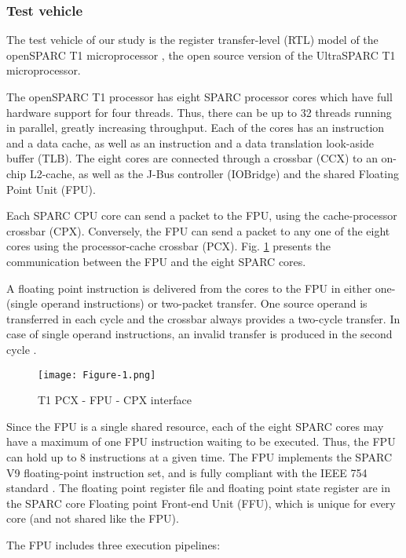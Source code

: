 \documentclass[12pt]{yalephd}
\begin{document}
\subsubsection{Test vehicle}

The test vehicle of our study is the register transfer-level (RTL) model of the openSPARC T1 microprocessor \cite{T1site}, the open source version of the UltraSPARC T1 microprocessor.

The openSPARC T1 processor has eight SPARC processor cores which have full hardware support for four threads. Thus, there can be up to 32 threads running in parallel, greatly increasing throughput. Each of the cores has an instruction and a data cache, as well as an instruction and a data translation look-aside buffer (TLB). The eight cores are connected through a crossbar (CCX) to an on-chip L2-cache, as well as the J-Bus controller (IOBridge) and the shared Floating Point Unit (FPU).

Each SPARC CPU core can send a packet to the FPU, using the cache-processor crossbar (CPX). Conversely, the FPU can send a packet to any one of the eight cores using the processor-cache crossbar (PCX). Fig. \ref{sC3fT1CPXFPUPCX} presents the communication between the FPU and the eight SPARC cores.

A floating point instruction is delivered from the cores to the FPU in either one- (single operand instructions) or two-packet transfer. One source operand is transferred in each cycle and the crossbar always provides a two-cycle transfer. In case of single operand instructions, an invalid transfer is produced in the second cycle \cite{Su06}.

\begin{figure}[!ht]
\centering
\texttt{[image: Figure-1.png]}
\caption{T1 PCX - FPU - CPX interface \cite{Su06}}\label{sC3fT1CPXFPUPCX}
\end{figure}


Since the FPU is a single shared resource, each of the eight SPARC cores may have a maximum of one FPU instruction waiting to be executed. Thus, the FPU can hold up to 8 instructions at a given time. The FPU implements the SPARC V9 floating-point instruction set, and is fully compliant with the IEEE 754 standard \cite{St97}. The floating point register file and floating point state register are in the SPARC core Floating point Front-end Unit (FFU), which is unique for every core (and not shared like the FPU).

The FPU includes three execution pipelines:
\end{document}
